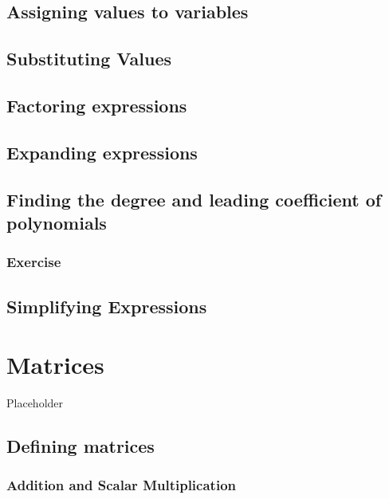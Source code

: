 \documentclass[
]{book}
\theoremstyle{definition}
\theoremstyle{definition}
\theoremstyle{definition}
\theoremstyle{definition}
\theoremstyle{remark}
\begin{document}
\section{Assigning values to variables}\label{assigning-values-to-variables}

\section{Substituting Values}\label{substituting-values}

\section{Factoring expressions}\label{factoring-expressions}

\section{Expanding expressions}\label{expanding-expressions}

\section{Finding the degree and leading coefficient of polynomials}\label{finding-the-degree-and-leading-coefficient-of-polynomials}

\subsection{Exercise}\label{exercise-3}

\section{Simplifying Expressions}\label{simplifying-expressions}

\chapter{Matrices}\label{matrices}

Placeholder

\section{Defining matrices}\label{defining-matrices}

\subsection{Addition and Scalar Multiplication}\label{addition-and-scalar-multiplication}
\end{document}
